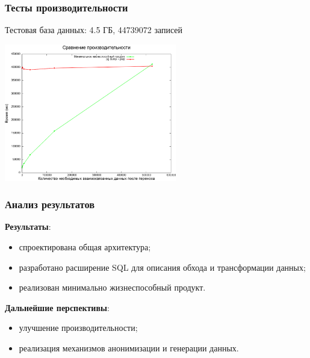 \documentclass[pdf, hyperref={unicode}, aspectratio=169]{beamer}
\begin{document}
\begin{frame}
\frametitle{Тесты производительности}
	Тестовая база данных: 4.5 ГБ, 44739072 записей

	\begin{center}
		\includegraphics[height = 6cm]{img/benchmark}
	\end{center}
\end{frame}


\begin{frame}
\frametitle{Анализ результатов}
	\textbf{Результаты}:

	\begin{itemize}
		\item спроектирована общая архитектура;
		\item разработано расширение SQL для описания обхода и трансформации данных;
		\item реализован минимально жизнеспособный продукт.
	\end{itemize}

	\textbf{Дальнейшие перспективы}:
	\begin{itemize}
		\item улучшение производительности;
		\item реализация механизмов анонимизации и генерации данных.
	\end{itemize}

\end{frame}
\end{document}
